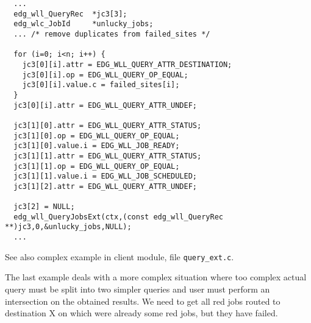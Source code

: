 \begin{verbatim}
  ...
  edg_wll_QueryRec  *jc3[3];
  edg_wlc_JobId     *unlucky_jobs;
  ... /* remove duplicates from failed_sites */

  for (i=0; i<n; i++) {
    jc3[0][i].attr = EDG_WLL_QUERY_ATTR_DESTINATION;
    jc3[0][i].op = EDG_WLL_QUERY_OP_EQUAL;
    jc3[0][i].value.c = failed_sites[i];
  }
  jc3[0][i].attr = EDG_WLL_QUERY_ATTR_UNDEF;

  jc3[1][0].attr = EDG_WLL_QUERY_ATTR_STATUS;
  jc3[1][0].op = EDG_WLL_QUERY_OP_EQUAL;
  jc3[1][0].value.i = EDG_WLL_JOB_READY;
  jc3[1][1].attr = EDG_WLL_QUERY_ATTR_STATUS;
  jc3[1][1].op = EDG_WLL_QUERY_OP_EQUAL;
  jc3[1][1].value.i = EDG_WLL_JOB_SCHEDULED;
  jc3[1][2].attr = EDG_WLL_QUERY_ATTR_UNDEF;

  jc3[2] = NULL;
  edg_wll_QueryJobsExt(ctx,(const edg_wll_QueryRec **)jc3,0,&unlucky_jobs,NULL);
  ...
\end{verbatim}

See also complex example in client module, file \texttt{query\_ext.c}.

\iffalse
The last example deals with a more complex situation where too complex actual
query must be
split into two simpler queries and user must perform an intersection
on the obtained results.
We need to get all red jobs routed to destination X on which were already some 
red jobs, but they have failed. 

